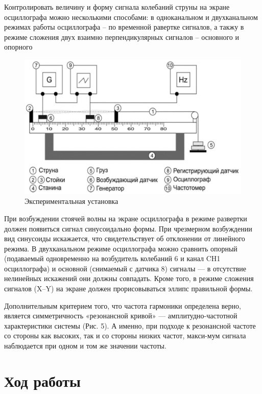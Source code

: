 \documentclass[a4paper,12pt]{article} %
\begin{document}
 Контролировать величину и форму сигнала колебаний струны на экране осциллографа можно несколькими способами: в одноканальном и двухканальном режимах работы осциллографа -- по временной равертке сигналов, а такжу в режиме сложения двух взаимно перпендикулярных сигналов -- основного и опорного
\begin{figure}[h]
\centering
\includegraphics[scale=0.5]{1}
\caption{Экспериментальная установка}
\end{figure}


При возбуждении стоячей волны на экране осциллографа в режиме развертки должен появиться сигнал синусоидально формы. При чрезмерном возбуждении вид синусоиды искажается, что свидетельствует об отклонении от линейного режима. В двухканальном режиме осциллографа можно сравнить опорный (подаваемый одновременно на возбудитель колебаний 6 и канал CH1 осциллографа) и основной (снимаемый с датчика 8) сигналы — в отсутствие нелинейных искажений они должны совпадать. Кроме того, в режиме сложения сигналов (X–Y) на экране должен прорисовываться эллипс правильной формы.

Дополнительным критерием того, что частота гармоники определена верно, является симметричность «резонансной кривой» — амплитудно-частотной характеристики системы (Рис. 5). А именно, при подходе к резонансной частоте со стороны как высоких, так и со стороны низких частот, макси-мум сигнала наблюдается при одном и том же значении частоты.

\section{Ход работы}
\end{document}
